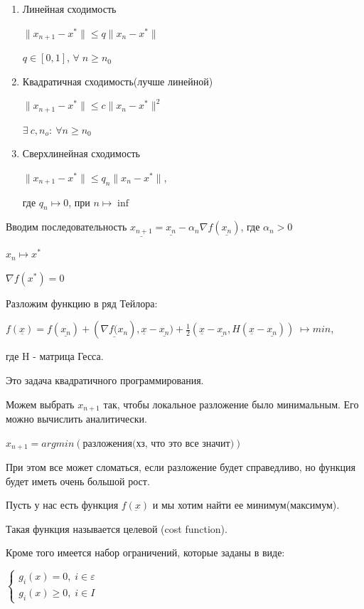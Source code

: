 \documentclass[a4paper, 12pt]{article}
\renewcommand{\epsilon}{\varepsilon}
\begin{document}
	\begin{enumerate}
		\item Линейная сходимость
		
		$\|x_{n+1}-x^*\| \leq q \|x_{n}-x^*\|$
		
		$q \in [0,1]$, $\forall \; n \geq n_0$
		\item Квадратичная сходимость(лучше линейной)
		
		$\|x_{n+1}-x^*\| \leq c \|x_{n}-x^*\|^2$
		
		$\exists \: c, n_o: \: \forall n \geq n_0$
		\item Сверхлинейная сходимость 
		
		$\|x_{n+1}-x^*\| \leq q_n \|x_{n}-x^*\|$,
		
		где $q_n \mapsto 0$, при $n\mapsto \inf$
	\end{enumerate}
	
	Вводим последовательность $\underline{x_{n+1}} = \underline{x_n} - \alpha_n\nabla f(\underline{x_n})$, где $\alpha_n >0$
	
	$x_n \mapsto x^*$
	
	$\nabla f(x^*) = 0$
	
	Разложим функцию в ряд Тейлора:
	
	$f(\underline{x}) = f(\underline{x_n}) + (\underline{\nabla f({x_n}}), \underline{x} - \underline{x_n}) + \frac{1}{2}(\underline{x} - \underline{x_n}, H(\underline{x} - \underline{x_n}))\; \mapsto min$,
	
	где H - матрица Гесса.
	
	Это задача квадратичного программирования.
	
	Можем выбрать $x_{n+1}$ так, чтобы локальное разложение было минимальным. Его можно вычислить аналитически. 
	
	$x_{n+1} = argmin (\textbf{разложения(хз, что это все значит)})$
	
	
	При этом все может сломаться, если разложение будет справедливо, но функция будет иметь очень большой рост.
	
	Пусть у нас есть функция $f(\underbar{x})$ и мы хотим найти ее минимум(максимум).
	
	Такая функция называется целевой (cost function).
	
	Кроме того имеется набор ограничений, которые заданы в виде:
	
	$\begin{cases}
		g_i(x) = 0, \; i\in \epsilon\\
		g_i(x) \geq 0, \; i\in I
	\end{cases}$
	
\end{document}
